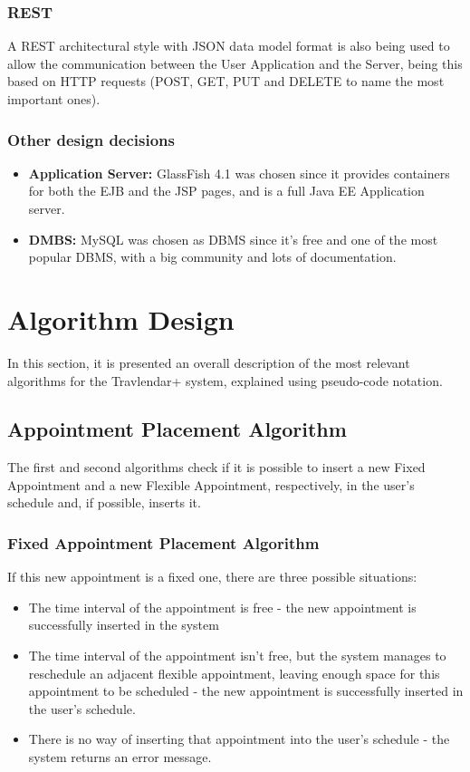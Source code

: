 \documentclass[12pt]{article}
\begin{document}
\subsubsection{REST} A REST architectural style with JSON data model format is also being used to allow the communication between the User Application and the Server, being this based on HTTP requests (POST, GET, PUT and DELETE to name the most important ones).

\subsubsection{Other design decisions}
\begin{itemize}
    \item \textbf{Application Server:} GlassFish 4.1 was chosen since it provides containers for both the EJB and the JSP pages, and is a full Java EE Application server.
    \item \textbf{DMBS:} MySQL was chosen as DBMS since it's free and one of the most popular DBMS, with a big community and lots of documentation.
\end{itemize}

\section{Algorithm Design}
In this section, it is presented an overall description of the most relevant algorithms for the Travlendar+ system, explained using pseudo-code notation.


\subsection{Appointment Placement Algorithm}
The first and second algorithms check if it is possible to insert a new Fixed Appointment and a new Flexible Appointment, respectively, in the user's schedule and, if possible, inserts it.

\subsubsection{Fixed Appointment Placement Algorithm}

If this new appointment is a fixed one, there are three possible situations:
\begin{itemize}
    \item The time interval of the appointment is free - the new appointment is successfully inserted in the system
    \item The time interval of the appointment isn't free, but the system manages to reschedule an adjacent flexible appointment, leaving enough space for this appointment to be scheduled - the new appointment is successfully inserted in the user's schedule.
    \item There is no way of inserting that appointment into the user's schedule - the system returns an error message.
\end{itemize}
\end{document}
